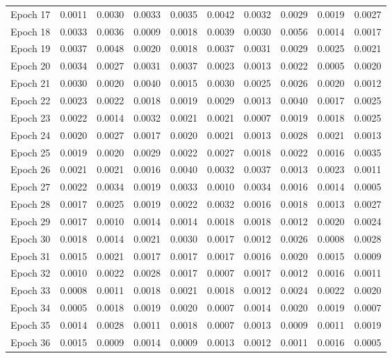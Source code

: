 \begin{table}[htbp]
\begin{tabular}{|l|l|l|l|l|l|l|l|l|l|}
Epoch 17 & 0.0011 & 0.0030 & 0.0033 & 0.0035 & 0.0042 & 0.0032 & 0.0029 & 0.0019 & 0.0027  \\
Epoch 18 & 0.0033 & 0.0036 & 0.0009 & 0.0018 & 0.0039 & 0.0030 & 0.0056 & 0.0014 & 0.0017  \\
Epoch 19 & 0.0037 & 0.0048 & 0.0020 & 0.0018 & 0.0037 & 0.0031 & 0.0029 & 0.0025 & 0.0021  \\
Epoch 20 & 0.0034 & 0.0027 & 0.0031 & 0.0037 & 0.0023 & 0.0013 & 0.0022 & 0.0005 & 0.0020  \\
Epoch 21 & 0.0030 & 0.0020 & 0.0040 & 0.0015 & 0.0030 & 0.0025 & 0.0026 & 0.0020 & 0.0012  \\
Epoch 22 & 0.0023 & 0.0022 & 0.0018 & 0.0019 & 0.0029 & 0.0013 & 0.0040 & 0.0017 & 0.0025  \\
Epoch 23 & 0.0022 & 0.0014 & 0.0032 & 0.0021 & 0.0021 & 0.0007 & 0.0019 & 0.0018 & 0.0025  \\
Epoch 24 & 0.0020 & 0.0027 & 0.0017 & 0.0020 & 0.0021 & 0.0013 & 0.0028 & 0.0021 & 0.0013  \\
Epoch 25 & 0.0019 & 0.0020 & 0.0029 & 0.0022 & 0.0027 & 0.0018 & 0.0022 & 0.0016 & 0.0035  \\
Epoch 26 & 0.0021 & 0.0021 & 0.0016 & 0.0040 & 0.0032 & 0.0037 & 0.0013 & 0.0023 & 0.0011  \\
Epoch 27 & 0.0022 & 0.0034 & 0.0019 & 0.0033 & 0.0010 & 0.0034 & 0.0016 & 0.0014 & 0.0005  \\
Epoch 28 & 0.0017 & 0.0025 & 0.0019 & 0.0022 & 0.0032 & 0.0016 & 0.0018 & 0.0013 & 0.0027  \\
Epoch 29 & 0.0017 & 0.0010 & 0.0014 & 0.0014 & 0.0018 & 0.0018 & 0.0012 & 0.0020 & 0.0024  \\
Epoch 30 & 0.0018 & 0.0014 & 0.0021 & 0.0030 & 0.0017 & 0.0012 & 0.0026 & 0.0008 & 0.0028  \\
Epoch 31 & 0.0015 & 0.0021 & 0.0017 & 0.0017 & 0.0017 & 0.0016 & 0.0020 & 0.0015 & 0.0009  \\
Epoch 32 & 0.0010 & 0.0022 & 0.0028 & 0.0017 & 0.0007 & 0.0017 & 0.0012 & 0.0016 & 0.0011  \\
Epoch 33 & 0.0008 & 0.0011 & 0.0018 & 0.0021 & 0.0018 & 0.0012 & 0.0024 & 0.0022 & 0.0020  \\
Epoch 34 & 0.0005 & 0.0018 & 0.0019 & 0.0020 & 0.0007 & 0.0014 & 0.0020 & 0.0019 & 0.0007  \\
Epoch 35 & 0.0014 & 0.0028 & 0.0011 & 0.0018 & 0.0007 & 0.0013 & 0.0009 & 0.0011 & 0.0019  \\
Epoch 36 & 0.0015 & 0.0009 & 0.0014 & 0.0009 & 0.0013 & 0.0012 & 0.0011 & 0.0016 & 0.0005  \\

\end{tabular}
\end{table}
